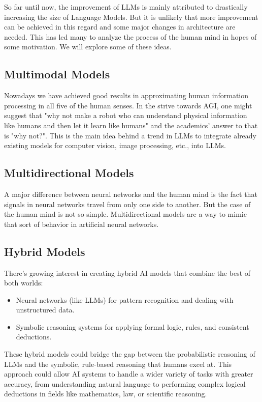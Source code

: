 So far until now, the improvement of LLMs is mainly attributed to drastically increasing the size of Language Models. But it is unlikely that more improvement can be achieved in this regard and some major changes in architecture are needed. This has led many to analyze the process of the human mind in hopes of some motivation. We will explore some of these ideas.

\subsection*{Multimodal Models}
Nowadays we have achieved good results in approximating human information processing in all five of the human senses. In the strive towards AGI, one might suggest that "why not make a robot who can understand physical information like humans and then let it learn like humans" and the academics' answer to that is "why not?". This is the main idea behind a trend in LLMs to integrate already existing models for computer vision, image processing, etc., into LLMs.

\subsection*{Multidirectional Models}
A major difference between neural networks and the human mind is the fact that signals in neural networks travel from only one side to another. But the case of the human mind is not so simple. Multidirectional models are a way to mimic that sort of behavior in artificial neural networks.

\subsection*{Hybrid Models}
There’s growing interest in creating hybrid AI models that combine the best of both worlds:
\begin{itemize}
    \item Neural networks (like LLMs) for pattern recognition and dealing with unstructured data.
    \item Symbolic reasoning systems for applying formal logic, rules, and consistent deductions.
\end{itemize}
These hybrid models could bridge the gap between the probabilistic reasoning of LLMs and the symbolic, rule-based reasoning that humans excel at. This approach could allow AI systems to handle a wider variety of tasks with greater accuracy, from understanding natural language to performing complex logical deductions in fields like mathematics, law, or scientific reasoning.

%


